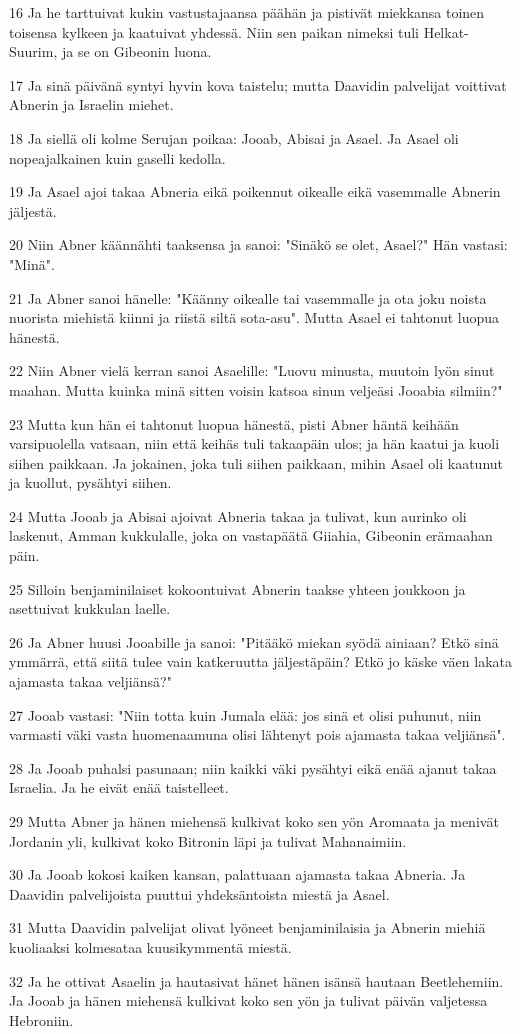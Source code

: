 \par 16 Ja he tarttuivat kukin vastustajaansa päähän ja pistivät miekkansa toinen toisensa kylkeen ja kaatuivat yhdessä. Niin sen paikan nimeksi tuli Helkat-Suurim, ja se on Gibeonin luona.
\par 17 Ja sinä päivänä syntyi hyvin kova taistelu; mutta Daavidin palvelijat voittivat Abnerin ja Israelin miehet.
\par 18 Ja siellä oli kolme Serujan poikaa: Jooab, Abisai ja Asael. Ja Asael oli nopeajalkainen kuin gaselli kedolla.
\par 19 Ja Asael ajoi takaa Abneria eikä poikennut oikealle eikä vasemmalle Abnerin jäljestä.
\par 20 Niin Abner käännähti taaksensa ja sanoi: "Sinäkö se olet, Asael?" Hän vastasi: "Minä".
\par 21 Ja Abner sanoi hänelle: "Käänny oikealle tai vasemmalle ja ota joku noista nuorista miehistä kiinni ja riistä siltä sota-asu". Mutta Asael ei tahtonut luopua hänestä.
\par 22 Niin Abner vielä kerran sanoi Asaelille: "Luovu minusta, muutoin lyön sinut maahan. Mutta kuinka minä sitten voisin katsoa sinun veljeäsi Jooabia silmiin?"
\par 23 Mutta kun hän ei tahtonut luopua hänestä, pisti Abner häntä keihään varsipuolella vatsaan, niin että keihäs tuli takaapäin ulos; ja hän kaatui ja kuoli siihen paikkaan. Ja jokainen, joka tuli siihen paikkaan, mihin Asael oli kaatunut ja kuollut, pysähtyi siihen.
\par 24 Mutta Jooab ja Abisai ajoivat Abneria takaa ja tulivat, kun aurinko oli laskenut, Amman kukkulalle, joka on vastapäätä Giiahia, Gibeonin erämaahan päin.
\par 25 Silloin benjaminilaiset kokoontuivat Abnerin taakse yhteen joukkoon ja asettuivat kukkulan laelle.
\par 26 Ja Abner huusi Jooabille ja sanoi: "Pitääkö miekan syödä ainiaan? Etkö sinä ymmärrä, että siitä tulee vain katkeruutta jäljestäpäin? Etkö jo käske väen lakata ajamasta takaa veljiänsä?"
\par 27 Jooab vastasi: "Niin totta kuin Jumala elää: jos sinä et olisi puhunut, niin varmasti väki vasta huomenaamuna olisi lähtenyt pois ajamasta takaa veljiänsä".
\par 28 Ja Jooab puhalsi pasunaan; niin kaikki väki pysähtyi eikä enää ajanut takaa Israelia. Ja he eivät enää taistelleet.
\par 29 Mutta Abner ja hänen miehensä kulkivat koko sen yön Aromaata ja menivät Jordanin yli, kulkivat koko Bitronin läpi ja tulivat Mahanaimiin.
\par 30 Ja Jooab kokosi kaiken kansan, palattuaan ajamasta takaa Abneria. Ja Daavidin palvelijoista puuttui yhdeksäntoista miestä ja Asael.
\par 31 Mutta Daavidin palvelijat olivat lyöneet benjaminilaisia ja Abnerin miehiä kuoliaaksi kolmesataa kuusikymmentä miestä.
\par 32 Ja he ottivat Asaelin ja hautasivat hänet hänen isänsä hautaan Beetlehemiin. Ja Jooab ja hänen miehensä kulkivat koko sen yön ja tulivat päivän valjetessa Hebroniin.

